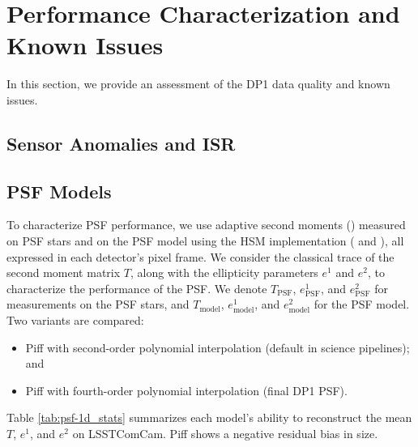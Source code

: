 \section{Performance Characterization and Known Issues
\label{sec:performance}}
%
In this section, we provide an assessment of the \gls{DP1} data quality and known issues.
%

\subsection{Sensor Anomalies and ISR}
\label{ssec:sensor_anomalies}

 

\subsection{PSF Models
\label{ssec:psf_models}}

To characterize \gls{PSF} performance, we use adaptive second moments (\citealt{2002AJ....123..583B})
measured on \gls{PSF} stars and on the PSF model using the \gls{HSM} 
implementation (\citealt{2003MNRAS.343..459H} and \citealt{2005MNRAS.361.1287M}), 
all expressed in each detector's pixel frame.
We consider the classical trace of the second moment matrix $T$, along with the ellipticity parameters $e^1$ and $e^2$, to characterize the performance of the PSF.
We denote $T_{\text{PSF}}$, $e^1_{\text{PSF}}$, and $e^2_{\text{PSF}}$ for
measurements on the \gls{PSF} stars, and $T_{\text{model}}$, $e^1_{\text{model}}$,
and $e^2_{\text{model}}$ for the \gls{PSF} model. Two variants are compared:
\begin{itemize}
\item Piff with second-order polynomial interpolation (default in science pipelines); and
\item Piff with fourth-order polynomial interpolation (final \gls{DP1} \gls{PSF}).
\end{itemize}

Table \ref{tab:psf-1d_stats} summarizes each model’s ability to reconstruct
the mean $T$, $e^1$, and $e^2$ on  \gls{LSSTComCam}. Piff shows a negative
residual bias in size. 



